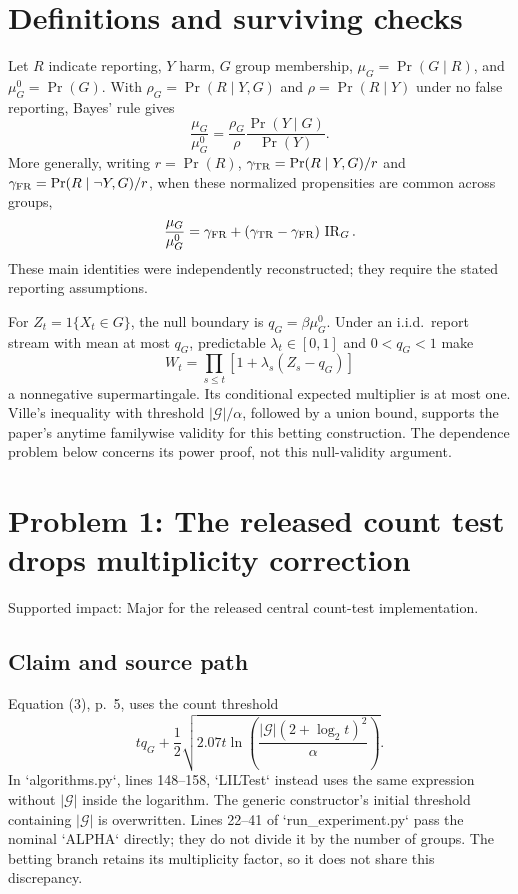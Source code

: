 \documentclass[10pt]{article}
\begin{document}
\section*{Definitions and surviving checks}
Let \(R\) indicate reporting, \(Y\) harm, \(G\) group membership, \(\mu_G=\Pr(G\mid R)\), and \(\mu_G^0=\Pr(G)\). With \(\rho_G=\Pr(R\mid Y,G)\) and \(\rho=\Pr(R\mid Y)\) under no false reporting, Bayes’ rule gives \[\frac{\mu_G}{\mu_G^0}=\frac{\rho_G}{\rho}\frac{\Pr(Y\mid G)}{\Pr(Y)}.\] More generally, writing \(r=\Pr(R)\), \(\gamma_{\rm TR}=\Pr(R\mid Y,G)/r\) and \(\gamma_{\rm FR}=\Pr(R\mid \neg Y,G)/r\), when these normalized propensities are common across groups, \[\frac{\mu_G}{\mu_G^0}=\gamma_{\rm FR}
       +(\gamma_{\rm TR}-\gamma_{\rm FR})\,\operatorname{IR}_G.\] These main identities were independently reconstructed; they require the stated reporting assumptions.\par
For \(Z_t=\mathrm{1}\{X_t\in G\}\), the null boundary is \(q_G=\beta\mu_G^0\). Under an i.i.d. report stream with mean at most \(q_G\), predictable \(\lambda_t\in[0,1]\) and \(0<q_G<1\) make \[W_t=\prod_{s\le t}[1+\lambda_s(Z_s-q_G)]\] a nonnegative supermartingale. Its conditional expected multiplier is at most one. Ville’s inequality with threshold \(|\mathcal G|/\alpha\), followed by a union bound, supports the paper’s anytime familywise validity for this betting construction. The dependence problem below concerns its power proof, not this null-validity argument.\par
\section*{Problem 1: The released count test drops multiplicity correction}
Supported impact: Major for the released central count-test implementation.\par
\subsection*{Claim and source path}
Equation (3), p. 5, uses the count threshold \[t q_G+\frac12\sqrt{2.07t\ln\!\left(
 \frac{|\mathcal G|(2+\log_2 t)^2}{\alpha}\right)}.\] In `algorithms.py`, lines 148–158, `LILTest` instead uses the same expression without \(|\mathcal G|\) inside the logarithm. The generic constructor’s initial threshold containing \(|\mathcal G|\) is overwritten. Lines 22–41 of `run\_experiment.py` pass the nominal `ALPHA` directly; they do not divide it by the number of groups. The betting branch retains its multiplicity factor, so it does not share this discrepancy.\par
\end{document}
